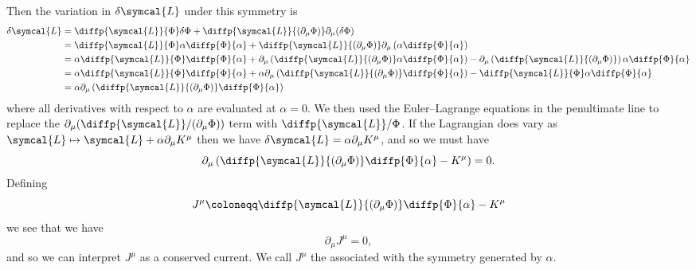 \documentclass[fleqn]{NotesClass}
\newcommand{\lagrangianDensity}{\symcal{L}}
\begin{document}
    Then the variation in \(\delta\lagrangianDensity\) under this symmetry is
    \begin{align}
        \delta\lagrangianDensity &= \diffp{\lagrangianDensity}{\Phi} \delta\Phi + \diffp{\lagrangianDensity}{(\partial_\mu \Phi)}\partial_\mu(\delta\Phi)\\
        &= \diffp{\lagrangianDensity}{\Phi} \alpha \diffp{\Phi}{\alpha} + \diffp{\lagrangianDensity}{(\partial_\mu \Phi)} \partial_\mu\left( \alpha\diffp{\Phi}{\alpha} \right)\\
        &= \alpha \diffp{\lagrangianDensity}{\Phi} \diffp{\Phi}{\alpha} + \partial_\mu\left( \diffp{\lagrangianDensity}{(\partial_\mu \Phi)} \alpha \diffp{\Phi}{\alpha} \right) - \partial_\mu\left( \diffp{\lagrangianDensity}{(\partial_\mu \Phi)} \right) \alpha\diffp{\Phi}{\alpha}\\
        &= \alpha\diffp{\lagrangianDensity}{\Phi} \diffp{\Phi}{\alpha} + \alpha \partial_\mu\left( \diffp{\lagrangianDensity}{(\partial_\mu \Phi)} \diffp{\Phi}{\alpha} \right) - \diffp{\lagrangianDensity}{\Phi} \alpha \diffp{\Phi}{\alpha}\\
        &= \alpha\partial_\mu \left( \diffp{\lagrangianDensity}{(\partial_\mu \Phi)} \diffp{\Phi}{\alpha} \right)
    \end{align}
    where all derivatives with respect to \(\alpha\) are evaluated at \(\alpha = 0\).
    We then used the Euler--Lagrange equations in the penultimate line to replace the \(\partial_\mu(\diffp{\lagrangianDensity}/{(\partial_\mu \Phi)})\) term with \(\diffp{\lagrangianDensity}/{\Phi}\).
    If the Lagrangian does vary as \(\lagrangianDensity \mapsto \lagrangianDensity + \alpha\partial_\mu K^\mu\) then we have \(\delta\lagrangianDensity = \alpha\partial_\mu K^\mu\), and so we must have
    \begin{equation}
        \partial_\mu \left( \diffp{\lagrangianDensity}{(\partial_\mu\Phi)} \diffp{\Phi}{\alpha} - K^\mu \right) = 0.
    \end{equation}
    Defining
    \begin{equation}
        J^\mu \coloneqq \diffp{\lagrangianDensity}{(\partial_\mu\Phi)} \diffp{\Phi}{\alpha} - K^\mu
    \end{equation}
    we see that we have
    \begin{equation}
        \partial_\mu J^\mu = 0,
    \end{equation}
    and so we can interpret \(J^\mu\) as a conserved current.
    We call \(J^\mu\) the  associated with the symmetry generated by \(\alpha\).
    
\end{document}
